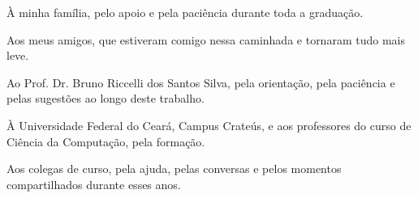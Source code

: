 À minha família, pelo apoio e pela paciência durante toda a graduação.

Aos meus amigos, que estiveram comigo nessa caminhada e tornaram tudo mais leve.

Ao Prof. Dr. Bruno Riccelli dos Santos Silva, pela orientação, pela paciência e pelas sugestões ao longo deste trabalho.

À Universidade Federal do Ceará, Campus Crateús, e aos professores do curso de Ciência da Computação, pela formação.

Aos colegas de curso, pela ajuda, pelas conversas e pelos momentos compartilhados durante esses anos.
